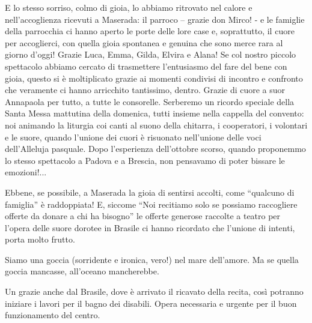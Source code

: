 \begin{citazione}
E lo stesso sorriso, colmo di gioia, lo abbiamo ritrovato nel calore e nell’accoglienza ricevuti a Maserada: il parroco – grazie don Mirco! - e le famiglie della parrocchia ci hanno aperto le porte delle lore case e, soprattutto, il cuore per accoglierci, con quella gioia spontanea e genuina che sono merce rara al giorno d’oggi! Grazie Luca, Emma, Gilda, Elvira e Alana! Se col nostro piccolo spettacolo abbiamo cercato di trasmettere l’entusiasmo del fare del bene con gioia, questo si è moltiplicato grazie ai momenti condivisi di incontro e confronto che veramente ci hanno arricchito tantissimo, dentro.
Grazie di cuore a suor Annapaola per tutto, a tutte le consorelle. Serberemo un ricordo speciale della Santa  Messa mattutina della domenica, tutti insieme nella cappella del convento: noi animando la liturgia coi canti al suono della chitarra, i cooperatori, i volontari e le suore, quando l’unione dei cuori è risuonato nell’unione delle voci dell’Alleluja pasquale. Dopo l’esperienza dell’ottobre scorso, quando proponemmo lo stesso spettacolo a Padova e a Brescia, non pensavamo di poter bissare le emozioni!...

Ebbene, se possibile, a Maserada la gioia di sentirsi accolti, come ``qualcuno di famiglia'' è raddoppiata! E, siccome ``Noi recitiamo solo se possiamo raccogliere offerte da donare a chi ha bisogno'' le offerte generose raccolte a teatro per l’opera delle suore dorotee in Brasile ci hanno ricordato che l’unione di intenti, porta molto frutto.

Siamo una goccia (sorridente e ironica, vero!) nel mare dell’amore. Ma se quella goccia mancasse, all’oceano mancherebbe.
\end{citazione}




Un grazie anche dal Brasile, dove è arrivato il ricavato della recita, così potranno iniziare i lavori per il bagno dei disabili. Opera necessaria e urgente per il buon funzionamento del centro.


